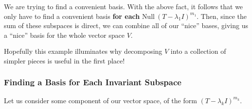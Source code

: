 \documentclass[10pt, oneside]{article}
\begin{document}
   We are trying to find a convenient basis. With the above fact, it follows that we only have to
   find a convenient basis \textbf{for each} $\text{Null} \ (T - \lambda_1 I)^{m_1}$.
   Then, since the sum of these subspaces is direct,
   we can combine all of our ``nice'' bases, giving us a ``nice'' basis for the whole vector space $V$.
   \newline

   Hopefully this example illuminates why decomposing $V$ into a collection of simpler pieces is useful in
   the first place!

   \subsubsection{Finding a Basis for Each Invariant Subspace}

   Let us consider some component of our vector space, of the form $(T - \lambda_k I)^{m_k}$. 

    
\end{document}
